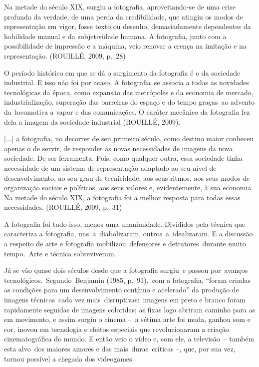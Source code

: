 \documentclass[
  letterpaper,
  a4paper,
  12pt]{scrbook}
\renewenvironment{quote}
  {\par\singlespacing\small\list{}{\rightmargin=0cm \leftmargin=4cm}%
   \item\relax}
  {\endlist}
\begin{document}
\begin{quote}
Na metade do século XIX, surgiu a fotografia, aproveitando-se de uma
crise profunda da verdade, de uma perda da credibilidade, que atingiu os
modos de representação em vigor, fosse texto ou desenho, demasiadamente
dependentes da habilidade manual e da subjetividade humana. A
fotografia, junto com a possibilidade de impressão e a máquina, veio
renovar a crença na imitação e na representação. (ROUILLÉ, 2009, p.~28)~
\end{quote}

O período histórico em que se dá o surgimento da fotografia é o da
sociedade industrial. E isso não foi por acaso. A fotografia~se associa
a todas as novidades tecnológicas da época, como expansão das metrópoles
e da economia de mercado, industrialização, superação das barreiras do
espaço e do tempo graças~ao advento da~locomotiva a vapor e das
comunicações. O caráter mecânico da fotografia fez dela a imagem da
sociedade industrial (ROUILLÉ, 2009).~

\begin{quote}
{[}...{]} a fotografia, no decorrer de seu primeiro século, como destino
maior conheceu apenas o de servir, de responder às novas necessidades de
imagens da nova sociedade. De ser ferramenta. Pois, como qualquer outra,
essa sociedade tinha necessidade de um sistema de representação adaptado
ao seu nível de desenvolvimento, ao seu grau de tecnicidade, aos seus
ritmos, aos seus modos de organização sociais e políticos, aos seus
valores e, evidentemente, à sua economia. Na metade do século XIX, a
fotografia foi a melhor resposta para todas essas necessidades.
(ROUILLÉ, 2009, p.~31)~
\end{quote}

A fotografia foi tudo isso, menos uma unanimidade. Divididos pela
técnica que caracteriza a fotografia, uns~a~diabolizaram,
outros~a~idealizaram. E a discussão a respeito de arte e fotografia
mobilizou~defensores e detratores~durante muito tempo.~Arte e técnica
sobreviveram.~

Já se vão quase dois séculos desde que a fotografia surgiu~e passou
por~avanços tecnológicos.~Segundo~Benjamin (1985, p.~91),~com a
fotografia, ``foram criadas as condições para um desenvolvimento
contínuo e acelerado'' da produção de imagens técnicas~cada vez
mais~disruptivas:~imagens em preto e branco foram rapidamente seguidas
de imagens coloridas; as fixas logo abriram caminho para as em
movimento, e assim surgiu o cinema --~a sétima arte foi muda, ganhou som
e cor, inovou em tecnologia e efeitos especiais que revolucionaram a
criação cinematográfica do mundo. E então veio o vídeo e, com ele, a
televisão~-- também esta alvo~dos maiores amores e das
mais~duras~críticas --, que, por sua vez, tornou possível a chegada dos
videogames.
\end{document}
